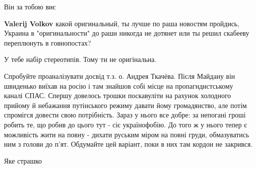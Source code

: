 \begin{itemize}
\begin{itemize}
Він за тобою виє

 
\textbf{Valerij Volkov} какой оригинальный, ты лучше по раша новостям пройдись,
Украина в "оригинальности" до раши никогда не дотянет или ты решил скабееву
переплюнуть в говнопостах?

 
У тебе набір стереотипів.
Тому ти не оригінальна.
\end{itemize}

 

Спробуйте проаналізувати досвід т.з. о. Андрея Ткачёва. Після Майдану він
швиденько виїхав на росію і там знайшов собі місце на пропагндистському каналі
СПАС. Спершу довелось трошки поскавуліти на рахунок холодного прийому й
небажання путінського режиму давати йому громадянство, але потім спромігся
довести свою потрібність. Зараз у нього все добре: за непогані гроші робить те,
що робив до цього тут - сіє українофобію. До того ж у нього тепер є можливість
жити на повну - дихати руським міром на повні груди, обмазуватись ним з голови
до п'ят. Обдумайте цей варіант, поки в них там кордон не закрився.


 
Яке страшко🤣

 


\end{itemize}
